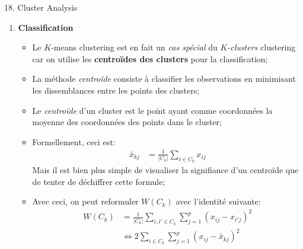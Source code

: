 \documentclass[12pt, titlepage, french]{report}
\begin{document}
\begin{CHPT_SUMM}[label = {CLUSTERS}]{18. Cluster Analysis}
\begin{enumerate}
\begin{itemize}
		\begin{align*}
			\min	\sum_{k = 1}^{K} W(C_{k})
		\end{align*}
		\item	Souvent, la mesure de dissemblance $W(C_{k})$ est définie avec la distance euclidienne des points au centroïde:
			\begin{align*}
			W(C_{k})	
			&=	\frac{1}{|C_{k}|} \sum_{i, i' \in C_{k}} \sum_{j = 1}^{p} (x_{ij} - x_{i'j})^{2}
			\end{align*}
		\item[]	$|C_{k}|$ peut être vu comme le $n$ habituel, c'est le nombre de points dans le cluster;
		\item	Le problème avec cette méthode est qu'il serait \textit{irréaliste de calculer toutes les possibilités de classification} des points en $K$ clusters afin de trouver celui avec la distance minimale;
		\item	Cependant, on utilise un algorithme qui utilise le centroïde pour trouver le minimum local;
		\end{itemize}
%		
	\item[]	\textbf{Classification}
		\begin{itemize}
		\item	Le $K$-means clustering est en fait un \textit{cas spécial} du \textit{$K$-clusters} clustering car on utilise les \textbf{centroïdes des clusters} pour la classification;
		\item	La méthode \textit{centroïde} consiste à classifier les observations en minimisant les dissemblances entre les points des clusters;
		\item	Le \textit{centroïde} d'un cluster est le point ayant comme coordonnées la moyenne des coordonnées des points dans le cluster;
		\item	Formellement, ceci est:
			\begin{align*}
				\bar{x}_{kj}	&=	\frac{1}{|C_{k}|} \sum_{i \in C_{k}} x_{ij}
			\end{align*}
			Mais il est bien plus simple de visualiser la signifiance d'un centroïde que de tenter de déchiffrer cette formule;
		\item	Avec ceci, on peut reformuler $W(C_{k})$ avec l'identité suivante:
			\begin{align*}
			W(C_{k})	
			&=	\frac{1}{|C_{k}|} \sum_{i, i' \in C_{k}} \sum_{j = 1}^{p} (x_{ij} - x_{i'j})^{2}	\\
			&\Leftrightarrow	2 \sum_{i \in C_{k}} \sum_{j = 1}^{p} (x_{ij} - \bar{x}_{kj})^{2}	\\

\end{align*}
\end{itemize}
\end{enumerate}
\end{CHPT_SUMM}
\end{document}
